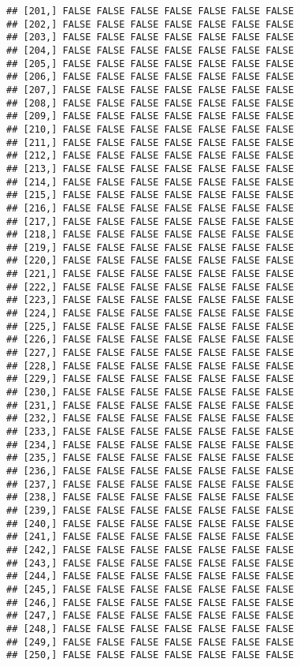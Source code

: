 \documentclass[
]{article}
\begin{document}
\begin{verbatim}
## [201,] FALSE FALSE FALSE FALSE FALSE FALSE FALSE
## [202,] FALSE FALSE FALSE FALSE FALSE FALSE FALSE
## [203,] FALSE FALSE FALSE FALSE FALSE FALSE FALSE
## [204,] FALSE FALSE FALSE FALSE FALSE FALSE FALSE
## [205,] FALSE FALSE FALSE FALSE FALSE FALSE FALSE
## [206,] FALSE FALSE FALSE FALSE FALSE FALSE FALSE
## [207,] FALSE FALSE FALSE FALSE FALSE FALSE FALSE
## [208,] FALSE FALSE FALSE FALSE FALSE FALSE FALSE
## [209,] FALSE FALSE FALSE FALSE FALSE FALSE FALSE
## [210,] FALSE FALSE FALSE FALSE FALSE FALSE FALSE
## [211,] FALSE FALSE FALSE FALSE FALSE FALSE FALSE
## [212,] FALSE FALSE FALSE FALSE FALSE FALSE FALSE
## [213,] FALSE FALSE FALSE FALSE FALSE FALSE FALSE
## [214,] FALSE FALSE FALSE FALSE FALSE FALSE FALSE
## [215,] FALSE FALSE FALSE FALSE FALSE FALSE FALSE
## [216,] FALSE FALSE FALSE FALSE FALSE FALSE FALSE
## [217,] FALSE FALSE FALSE FALSE FALSE FALSE FALSE
## [218,] FALSE FALSE FALSE FALSE FALSE FALSE FALSE
## [219,] FALSE FALSE FALSE FALSE FALSE FALSE FALSE
## [220,] FALSE FALSE FALSE FALSE FALSE FALSE FALSE
## [221,] FALSE FALSE FALSE FALSE FALSE FALSE FALSE
## [222,] FALSE FALSE FALSE FALSE FALSE FALSE FALSE
## [223,] FALSE FALSE FALSE FALSE FALSE FALSE FALSE
## [224,] FALSE FALSE FALSE FALSE FALSE FALSE FALSE
## [225,] FALSE FALSE FALSE FALSE FALSE FALSE FALSE
## [226,] FALSE FALSE FALSE FALSE FALSE FALSE FALSE
## [227,] FALSE FALSE FALSE FALSE FALSE FALSE FALSE
## [228,] FALSE FALSE FALSE FALSE FALSE FALSE FALSE
## [229,] FALSE FALSE FALSE FALSE FALSE FALSE FALSE
## [230,] FALSE FALSE FALSE FALSE FALSE FALSE FALSE
## [231,] FALSE FALSE FALSE FALSE FALSE FALSE FALSE
## [232,] FALSE FALSE FALSE FALSE FALSE FALSE FALSE
## [233,] FALSE FALSE FALSE FALSE FALSE FALSE FALSE
## [234,] FALSE FALSE FALSE FALSE FALSE FALSE FALSE
## [235,] FALSE FALSE FALSE FALSE FALSE FALSE FALSE
## [236,] FALSE FALSE FALSE FALSE FALSE FALSE FALSE
## [237,] FALSE FALSE FALSE FALSE FALSE FALSE FALSE
## [238,] FALSE FALSE FALSE FALSE FALSE FALSE FALSE
## [239,] FALSE FALSE FALSE FALSE FALSE FALSE FALSE
## [240,] FALSE FALSE FALSE FALSE FALSE FALSE FALSE
## [241,] FALSE FALSE FALSE FALSE FALSE FALSE FALSE
## [242,] FALSE FALSE FALSE FALSE FALSE FALSE FALSE
## [243,] FALSE FALSE FALSE FALSE FALSE FALSE FALSE
## [244,] FALSE FALSE FALSE FALSE FALSE FALSE FALSE
## [245,] FALSE FALSE FALSE FALSE FALSE FALSE FALSE
## [246,] FALSE FALSE FALSE FALSE FALSE FALSE FALSE
## [247,] FALSE FALSE FALSE FALSE FALSE FALSE FALSE
## [248,] FALSE FALSE FALSE FALSE FALSE FALSE FALSE
## [249,] FALSE FALSE FALSE FALSE FALSE FALSE FALSE
## [250,] FALSE FALSE FALSE FALSE FALSE FALSE FALSE

\end{verbatim}
\end{document}
